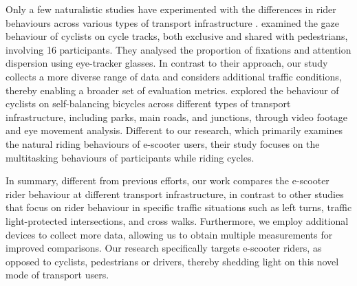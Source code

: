 Only a few naturalistic studies have experimented with the differences in rider behaviours across various types of transport infrastructure \cite{MANTUANO2017408, 10.1145/3568444.3568451}. \citet{MANTUANO2017408} examined the gaze behaviour of cyclists on cycle tracks, both exclusive and shared with pedestrians, involving 16 participants. They analysed the proportion of fixations and attention dispersion using eye-tracker glasses. In contrast to their approach, our study collects a more diverse range of data and considers additional traffic conditions, thereby enabling a broader set of evaluation metrics. \citet{10.1145/3568444.3568451} explored the behaviour of cyclists on self-balancing bicycles across different types of transport infrastructure, including parks, main roads, and junctions, through video footage and eye movement analysis. Different to our research, which primarily examines the natural riding behaviours of e-scooter users, their study focuses on the multitasking behaviours of participants while riding cycles.

In summary, different from previous efforts, our work compares the e-scooter rider behaviour at different transport infrastructure, in contrast to other studies that focus on rider behaviour in specific traffic situations such as left turns, traffic light-protected intersections, and cross walks. Furthermore, we employ additional devices to collect more data, allowing us to obtain multiple measurements for improved comparisons. Our research specifically targets e-scooter riders, as opposed to cyclists, pedestrians or drivers, thereby shedding light on this novel mode of transport users.